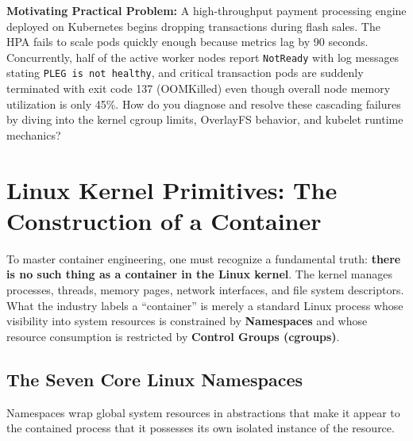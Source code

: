 \begin{chaptergoalsbox}
\textbf{Motivating Practical Problem:}
A high-throughput payment processing engine deployed on Kubernetes begins dropping transactions during flash sales. The HPA fails to scale pods quickly enough because metrics lag by 90 seconds. Concurrently, half of the active worker nodes report \texttt{NotReady} with log messages stating \texttt{PLEG is not healthy}, and critical transaction pods are suddenly terminated with exit code 137 (OOMKilled) even though overall node memory utilization is only 45\%. How do you diagnose and resolve these cascading failures by diving into the kernel cgroup limits, OverlayFS behavior, and kubelet runtime mechanics?
\end{chaptergoalsbox}

\section{Linux Kernel Primitives: The Construction of a Container}

To master container engineering, one must recognize a fundamental truth: \textbf{there is no such thing as a container in the Linux kernel}. The kernel manages processes, threads, memory pages, network interfaces, and file system descriptors. What the industry labels a ``container'' is merely a standard Linux process whose visibility into system resources is constrained by \textbf{Namespaces} and whose resource consumption is restricted by \textbf{Control Groups (cgroups)}.

\subsection{The Seven Core Linux Namespaces}
Namespaces wrap global system resources in abstractions that make it appear to the contained process that it possesses its own isolated instance of the resource.

